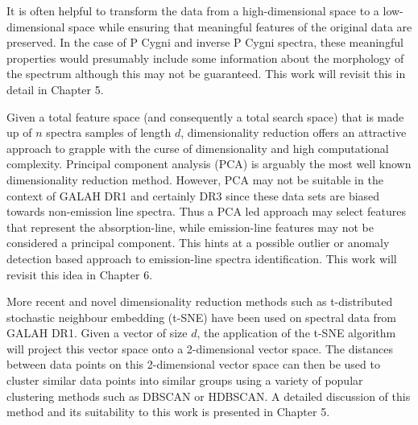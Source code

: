 It is often helpful to transform the data from a high-dimensional space to a low-dimensional space while ensuring that meaningful features of the original data are preserved. In the case of P Cygni and inverse P Cygni spectra, these meaningful properties would presumably include some information about the morphology of the spectrum although this may not be guaranteed. This work will revisit this in detail in Chapter 5.

Given a total feature space (and consequently a total search space) that is made up of $n$ spectra samples of length $d$, dimensionality reduction offers an attractive approach to grapple with the curse of dimensionality and high computational complexity. Principal component analysis (PCA) is arguably the most well known dimensionality reduction method. However, PCA may not be suitable in the context of GALAH DR1 and certainly DR3 since these data sets are biased towards non-emission line spectra. Thus a PCA led approach may select features that represent the absorption-line, while emission-line features may not be considered a principal component. This hints at a possible outlier or anomaly detection based approach to emission-line spectra identification. This work will revisit this idea in Chapter 6.

More recent and novel dimensionality reduction methods such as t-distributed stochastic neighbour embedding (t-SNE)\cite{van2008visualizing} have been used on spectral data from GALAH DR1\cite{traven2017galah}. Given a vector of size $d$, the application of the t-SNE algorithm will project this vector space onto a 2-dimensional vector space. The distances between data points on this 2-dimensional vector space can then be used to cluster similar data points into similar groups using a variety of popular clustering methods such as DBSCAN\cite{ester1996density} or HDBSCAN\cite{campello2013density}. A detailed discussion of this method and its suitability to this work is presented in Chapter 5.

